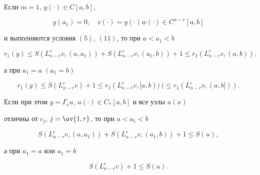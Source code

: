 \setcounter{lem}{1} 


 


\begin{lem} Если $m=1$, $y(\cdot)\in C[a,b]$, 


\begin{equation} 


y(a_1)=0,\quad v(\cdot)=y(\cdot)w(\cdot)\in 


C^{n-r}[a,b] 


\end{equation} 


и выполняются условия $(5)$, $(11)$, то при $a<a_1<b$ 


\begin{equation} 


r_1(y)\le S(L^c_{n-r}v,(a,a_1))+ 


S(L^c_{n-r}v,(a_1,b))+1\le r_1 


(L^c_{n-r}v,(a,b)), 


\end{equation} 


а при $a_1=a$ $(a_1=b)$ 


\begin{equation} 


r_1(y)\le S(L^c_{n-r}v)+1\le r_1(L^c_{n-r}v,[a,b)) 


\ (\le r_1(L^c_{n-r}v,(a,b])). 


\end{equation} 


 


Если при этом $y=\Gamma_c u$, $u(\cdot)\in C_*[a,b]$ и все узлы $u(x)$ 


отличны от $c_j$, $j=\ov{1,r}$, то при $a<a_1<b$ 


\begin{equation} 


S(L^c_{n-r}v,(a,a_1))+S(L^c_{n-r}v,(a_1,b))+1\le S(u), 


\end{equation} 


а при $a_1=a$ или $a_1=b$ 


\begin{equation} 


S(L^c_{n-r}v)+1\le S(u). 


\end{equation} 


\end{lem} 


